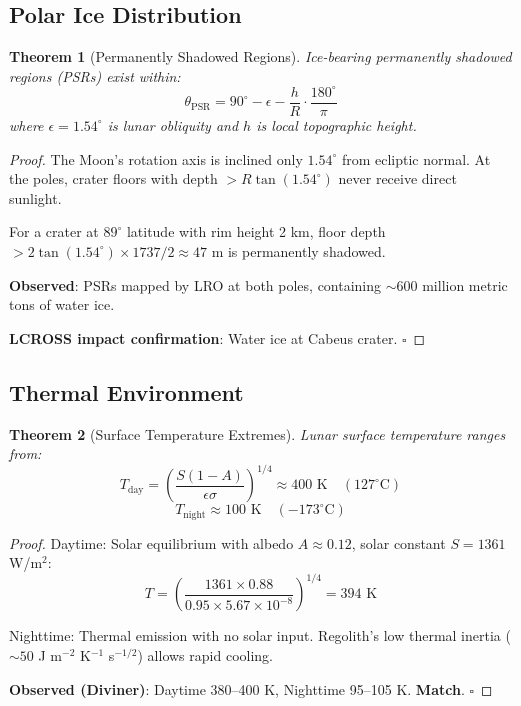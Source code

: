 \documentclass[twocolumn,10pt]{article}
\newtheorem{theorem}{Theorem}[section]
\theoremstyle{definition}
\theoremstyle{remark}
\begin{document}
\subsection{Polar Ice Distribution}

\begin{theorem}[Permanently Shadowed Regions]
\label{thm:psr}
Ice-bearing permanently shadowed regions (PSRs) exist within:
\begin{equation}
\theta_{\text{PSR}} = 90^\circ - \epsilon - \frac{h}{R} \cdot \frac{180^\circ}{\pi}
\end{equation}
where $\epsilon = 1.54^\circ$ is lunar obliquity and $h$ is local topographic height.
\end{theorem}

\begin{proof}
The Moon's rotation axis is inclined only $1.54^\circ$ from ecliptic normal. At the poles, crater floors with depth $> R\tan(1.54^\circ)$ never receive direct sunlight.

For a crater at $89^\circ$ latitude with rim height 2 km, floor depth $> 2\tan(1.54^\circ) \times 1737/2 \approx 47$ m is permanently shadowed.

\textbf{Observed}: PSRs mapped by LRO at both poles, containing $\sim 600$ million metric tons of water ice.

\textbf{LCROSS impact confirmation}: Water ice at Cabeus crater. $\square$
\end{proof}

\subsection{Thermal Environment}

\begin{theorem}[Surface Temperature Extremes]
\label{thm:thermal}
Lunar surface temperature ranges from:
\begin{equation}
T_{\text{day}} = \left(\frac{S(1-A)}{\epsilon\sigma}\right)^{1/4} \approx 400 \text{ K} \quad (127^\circ\text{C})
\end{equation}
\begin{equation}
T_{\text{night}} \approx 100 \text{ K} \quad (-173^\circ\text{C})
\end{equation}
\end{theorem}

\begin{proof}
Daytime: Solar equilibrium with albedo $A \approx 0.12$, solar constant $S = 1361$ W/m$^2$:
\begin{equation}
T = \left(\frac{1361 \times 0.88}{0.95 \times 5.67 \times 10^{-8}}\right)^{1/4} = 394 \text{ K}
\end{equation}

Nighttime: Thermal emission with no solar input. Regolith's low thermal inertia ($\sim 50$ J m$^{-2}$ K$^{-1}$ s$^{-1/2}$) allows rapid cooling.

\textbf{Observed (Diviner)}: Daytime 380--400 K, Nighttime 95--105 K. \textbf{Match}. $\square$
\end{proof}
\end{document}
